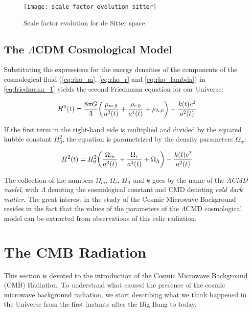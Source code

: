 \begin{figure}
        \centering
        \texttt{[image: scale\_factor\_evolution\_sitter]}
        \caption{Scale factor evolution for de Sitter space}
        \label{fig:scale_factor_evolution_sitter}
\end{figure}

\subsection{The \texorpdfstring{$\Lambda$}{LAMBDA-}CDM Cosmological Model}

Substituting the expressions for the energy densities of the components of
the cosmological fluid (\autoref{eq:rho_m}, \autoref{eq:rho_r} and
\autoref{eq:rho_lambda}) in \autoref{eq:friedmann_1} yields the second
Friedmann equation for our Universe:

\begin{equation}
        H^2\qty(t) = \frac{8\pi G}{3} \qty(\frac{\rho_{m,0}}{a^3\qty(t)} +
        \frac{\rho_{r,0}}{a^4\qty(t)} + \rho_{\Lambda,0}) -
        \frac{k\qty(t) c^2}{a^2\qty(t)}
\end{equation}

If the first term in the right-hand side is multiplied and
divided by the squared hubble constant $H^2_0$, the equation is parametrized
by the density parameters $\Omega_w$:

\begin{equation}
        H^2\qty(t) = H^2_0 \qty(\frac{\Omega_m}{a^3\qty(t)} +
        \frac{\Omega_r}{a^4\qty(t)} + \Omega_\Lambda) -
        \frac{k\qty(t) c^2}{a^2\qty(t)}
\end{equation}

The collection of the numbers $\Omega_m$, $\Omega_r$, $\Omega_\Lambda$ and
$k$ goes by the name of the \emph{$\Lambda$CMD model}, with $\Lambda$
denoting the cosmological constant and CMD denoting \emph{cold dark matter}.
The great interest in the study of the Cosmic Microwave Background resides
in the fact that the values of the parameters of the $\Lambda$CMD
cosmological model can be extracted from observations of this relic
radiation.

\section{The CMB Radiation}

This section is devoted to the introduction of the Cosmic Microwave
Background (CMB) Radiation. To understand what caused the presence of the
cosmic microwave background radiation, we start describing
what we think happened in the Universe from the first instants after the
Big Bang to today.

